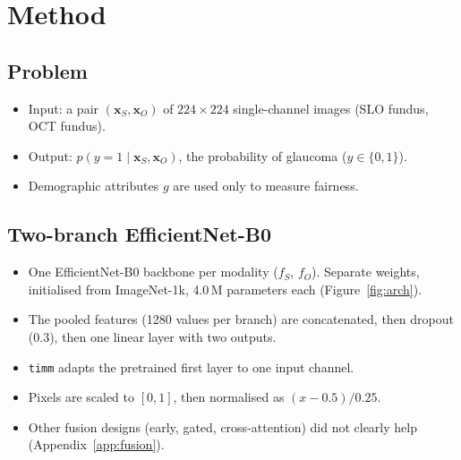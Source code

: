 \documentclass[11pt]{article}
\begin{document}
\section{Method}
\subsection{Problem}
\begin{itemize}
\item Input: a pair $(\mathbf{x}_S,\mathbf{x}_O)$ of $224\times224$ single-channel images (SLO fundus, OCT fundus).
\item Output: $p(y=1\mid \mathbf{x}_S,\mathbf{x}_O)$, the probability of glaucoma ($y\in\{0,1\}$).
\item Demographic attributes $g$ are used only to measure fairness.
\end{itemize}

\subsection{Two-branch EfficientNet-B0}
\begin{itemize}
\item One EfficientNet-B0 backbone per modality ($f_S$, $f_O$). Separate weights, initialised from ImageNet-1k, 4.0\,M parameters each (Figure~\ref{fig:arch}).
\item The pooled features (1280 values per branch) are concatenated, then dropout (0.3), then one linear layer with two outputs.
\item \texttt{timm} adapts the pretrained first layer to one input channel.
\item Pixels are scaled to $[0,1]$, then normalised as $(x-0.5)/0.25$.
\item Other fusion designs (early, gated, cross-attention) did not clearly help (Appendix~\ref{app:fusion}).
\end{itemize}
\end{document}
